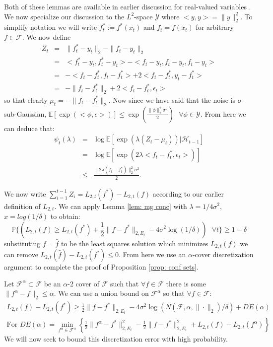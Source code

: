 \documentclass{article}
\newcommand{\Exp}{\mathds{E}}
\newcommand{\Prob}{\mathds{P}}
\newcommand{\Yc}{\mathcal{Y}}
\newcommand{\Fc}{\mathcal{F}}
\begin{document}
Both of these lemmas are available in earlier discussion for real-valued variables \cite{russo2013}.
We now specialize our discussion to the $L^2$-space $\Yc$ where $<y,y> = \|y \|_2^2$.
To simplify notation we will write $f^*_t := f^*(x_t)$ and $f_t = f(x_t)$ for arbitrary $f\in \Fc$.
We now define
\begin{eqnarray*}
	Z_t &=& \|f_t^* - y_t \|_2 - \| f_t - y_t \|_2 \\
	&=& <f_t^* - y_t, f_t^* - y_t> - <f_t - y_t, f_t - y_t, f_t - y_t> \\
	&=& -<f_t - f_t^*, f_t - f_t^*> + 2<f_t - f_t^*, y_t-f_t^*> \\
	&=& - \|f_t - f_t^* \|_2 + 2<f_t - f_t^*, \epsilon_t>
\end{eqnarray*}
so that clearly $\mu_t = - \|f_t - f_t^* \|_2$.
Now since we have said that the noise is $\sigma$-sub-Gaussian,
$ \Exp [ \exp \left( < \phi, \epsilon > \right) ] \le \exp \left( \frac{ \| \phi \|_2^2 \sigma^2}{2} \right)
\text{ } \forall \phi \in \mathcal{Y}$.
From here we can deduce that:
\begin{eqnarray*}
	\psi_t(\lambda) &=& \log \Exp [ \exp \left(\lambda ( Z_t -\mu_t)\right) | \mathcal{H}_{t-1} ]  \\
	&=& \log \Exp[ \exp (2 \lambda <f_t - f_t^*, \epsilon_t>)] \\
	&\le& \frac{\|2 \lambda (f_t - f_t^*) \|_2^2 \sigma^2}{2}.
\end{eqnarray*}

We now write $\sum_{i=1}^{t-1} Z_i = L_{2,t}(f^*) - L_{2,t}(f)$ according to our earlier definition of $L_{2,t}$.
We can apply Lemma \ref{lem: mg conc} with $\lambda = 1/{4\sigma^2}$, $x=log(1/\delta)$ to obtain:
$$ \Prob \{ \left( L_{2,t}(f) \ge L_{2,t}(f^*) + \frac{1}{2} \| f- f^*\|_{2,E_t} - 4\sigma^2\log(1/\delta) \right) \text{ } \forall t \} \ge 1-\delta$$
substituting $f = \hat{f}$ to be the least squares solution which minimizes $L_{2,t}(f)$ we can remove $L_{2,t}(\hat{f}) - L_{2,t}(f^*) \le 0$.
From here we use an $\alpha$-cover discretization argument to complete the proof of Proposition \ref{prop: conf sets}.

Let $\mathcal{F}^\alpha \subset \mathcal{F}$ be an $\alpha$-2 cover of $\mathcal{F}$
such that $\forall f \in \mathcal{F}$ there is some $ \| f^\alpha - f \|_2 \le \alpha$.
We can use a union bound on $\mathcal{F}^\alpha$ so that $\forall f \in \mathcal{F}$:
\begin{eqnarray}
\label{eq: L err bounds}
	L_{2,t}(f) - L_{2,t}(f^*) \ge \frac{1}{2} \|f-f^*\|_{2,E_t} - 4\sigma^2\log(N(\mathcal{F},\alpha,\|\cdot\|_2)/\delta) + DE(\alpha) \\
	\text{For } DE(\alpha) = \min_{f^\alpha \in \Fc^\alpha} \left\{ \frac{1}{2} \|f^\alpha-f^*\|_{2,E_t}^2 -
	\frac{1}{2} \| f-f^* \|_{2,E_t}^2 + L_{2,t}(f) - L_{2,t}(f^\alpha) \right\} \nonumber
\end{eqnarray}
We will now seek to bound this discretization error with high probability.
\end{document}
